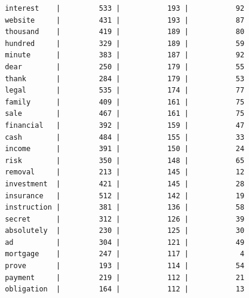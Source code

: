 \documentclass[a4paper,12pt]{article}
\begin{document}
\begin{verbatim}
 interest    |         533 |           193 |           92
 website     |         431 |           193 |           87
 thousand    |         419 |           189 |           80
 hundred     |         329 |           189 |           59
 minute      |         383 |           187 |           92
 dear        |         250 |           179 |           55
 thank       |         284 |           179 |           53
 legal       |         535 |           174 |           77
 family      |         409 |           161 |           75
 sale        |         467 |           161 |           75
 financial   |         392 |           159 |           47
 cash        |         484 |           155 |           33
 income      |         391 |           150 |           24
 risk        |         350 |           148 |           65
 removal     |         213 |           145 |           12
 investment  |         421 |           145 |           28
 insurance   |         512 |           142 |           19
 instruction |         381 |           136 |           58
 secret      |         312 |           126 |           39
 absolutely  |         230 |           125 |           30
 ad          |         304 |           121 |           49
 mortgage    |         247 |           117 |            4
 prove       |         193 |           114 |           54
 payment     |         219 |           112 |           21
 obligation  |         164 |           112 |           13
	\end{verbatim}
	
\end{document}
